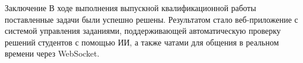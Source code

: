 \documentclass[aspectratio=169]{beamer}
\begin{document}
\begin{frame}{Заключение}
\small
В ходе выполнения выпускной квалификационной работы поставленные задачи были успешно решены. Результатом стало веб-приложение с системой управления заданиями, поддерживающей автоматическую проверку решений студентов с помощью ИИ, а также чатами для общения в реальном времени через WebSocket.
\end{frame}


%




%
%
%
\end{document}
